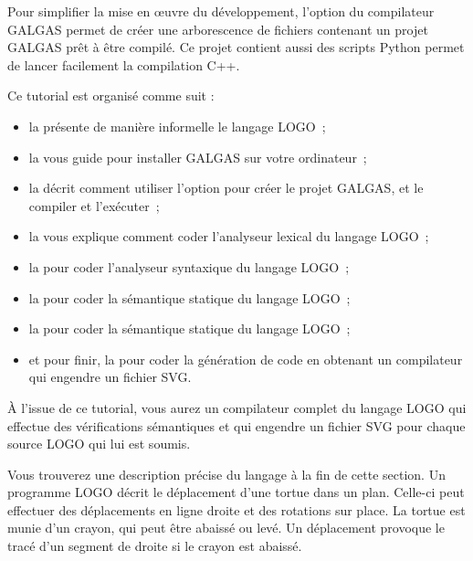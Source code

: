 Pour simplifier la mise en œuvre du développement, l'option  du compilateur GALGAS permet de créer une arborescence de fichiers contenant un projet GALGAS prêt à être compilé. Ce projet contient aussi des scripts Python permet de lancer facilement la compilation C++.

Ce tutorial est organisé comme suit :
\begin{itemize}
  \item la  présente de manière informelle le langage LOGO~;
  \item la  vous guide pour installer GALGAS sur votre ordinateur~;
  \item la  décrit comment utiliser l'option  pour créer le projet GALGAS, et le compiler et l'exécuter~;
  \item la  vous explique comment coder l'analyseur lexical du langage LOGO~;
  \item la  pour coder l'analyseur syntaxique du langage LOGO~;
  \item la  pour coder la sémantique statique du langage LOGO~;
  \item la  pour coder la sémantique statique du langage LOGO~;
  \item et pour finir, la  pour coder la génération de code en obtenant un compilateur qui engendre un fichier SVG.
\end{itemize}

À l'issue de ce tutorial, vous aurez un compilateur complet  du langage LOGO qui effectue des vérifications sémantiques et qui engendre un fichier SVG pour chaque source LOGO qui lui est soumis.







Vous trouverez une description précise du langage à la fin de cette section. Un programme LOGO décrit le déplacement d'une tortue dans un plan. Celle-ci peut effectuer des déplacements en ligne droite et des rotations sur place. La tortue est munie d'un crayon, qui peut être abaissé ou levé. Un déplacement provoque le tracé d'un segment de droite si le crayon est abaissé.

